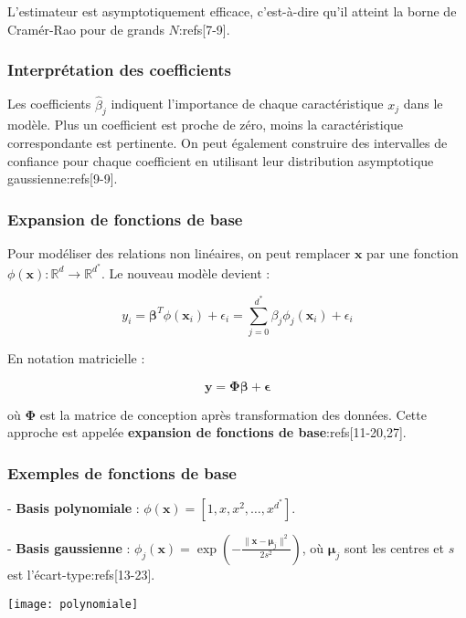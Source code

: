 \documentclass[10pt,a4paper]{article}
\begin{document}
L'estimateur est asymptotiquement efficace, c'est-à-dire qu'il atteint la borne de Cramér-Rao pour de grands $N$:refs[7-9].

\subsubsection*{Interprétation des coefficients}

Les coefficients $\hat{\beta}_j$ indiquent l'importance de chaque caractéristique $x_j$ dans le modèle. Plus un coefficient est proche de zéro, moins la caractéristique correspondante est pertinente. On peut également construire des intervalles de confiance pour chaque coefficient en utilisant leur distribution asymptotique gaussienne:refs[9-9].

\subsubsection*{Expansion de fonctions de base}

Pour modéliser des relations non linéaires, on peut remplacer $\mathbf{x}$ par une fonction $\phi(\mathbf{x}): \mathbb{R}^{d} \rightarrow \mathbb{R}^{d^{*}}$. Le nouveau modèle devient :

$$
y_{i} = \boldsymbol{\beta}^{T} \phi(\mathbf{x}_{i}) + \epsilon_{i} = \sum_{j=0}^{d^{*}} \beta_{j} \phi_{j}(\mathbf{x}_{i}) + \epsilon_{i}
$$

En notation matricielle :

$$
\mathbf{y} = \boldsymbol{\Phi} \boldsymbol{\beta} + \boldsymbol{\epsilon}
$$

où $\boldsymbol{\Phi}$ est la matrice de conception après transformation des données. Cette approche est appelée \textbf{expansion de fonctions de base}:refs[11-20,27].

\subsubsection*{Exemples de fonctions de base}

- \textbf{Basis polynomiale} : $\phi(\mathbf{x}) = [1, x, x^2, \ldots, x^{d^{*}}]$.

- \textbf{Basis gaussienne} : $\phi_j(\mathbf{x}) = \exp\left(-\frac{\|\mathbf{x} - \boldsymbol{\mu}_j\|^2}{2s^2}\right)$, où $\boldsymbol{\mu}_j$ sont les centres et $s$ est l'écart-type:refs[13-23].

\texttt{[image: polynomiale]}
\end{document}
